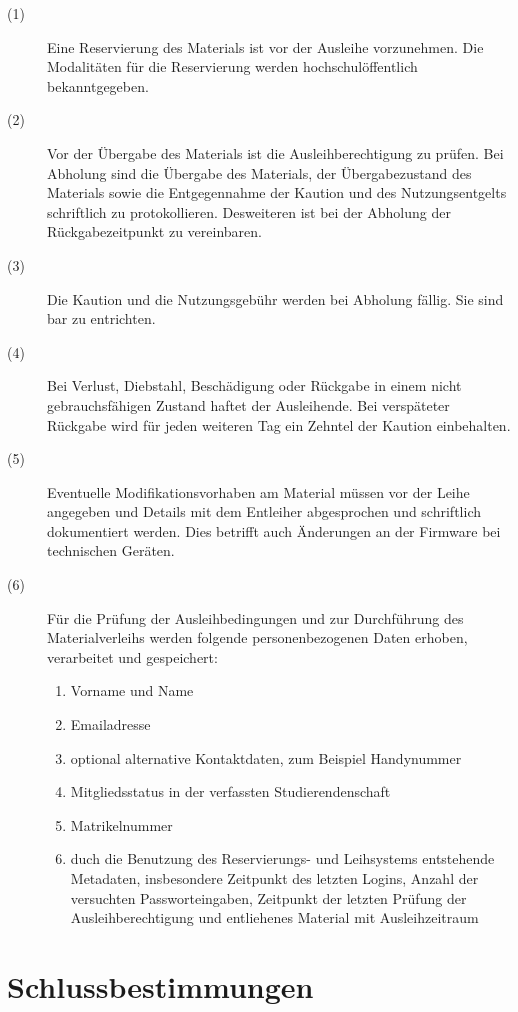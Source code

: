 \documentclass[a4paper]{article}
\begin{document}
\begin{description}
\item[(1)] Eine Reservierung des Materials ist vor der Ausleihe vorzunehmen. Die Modalitäten für die Reservierung werden hochschulöffentlich bekanntgegeben.
\item[(2)] Vor der Übergabe des Materials ist die Ausleihberechtigung zu prüfen. Bei Abholung sind die Übergabe des Materials, der Übergabezustand des Materials sowie die Entgegennahme der Kaution und des Nutzungsentgelts schriftlich zu protokollieren. Desweiteren ist bei der Abholung der Rückgabezeitpunkt zu vereinbaren.
\item[(3)] Die Kaution und die Nutzungsgebühr werden bei Abholung fällig. Sie sind bar zu entrichten.
\item[(4)] Bei Verlust, Diebstahl, Beschädigung oder Rückgabe in einem nicht gebrauchsfähigen Zustand haftet der Ausleihende. Bei verspäteter Rückgabe wird für jeden weiteren Tag ein Zehntel der Kaution einbehalten.
\item[(5)] Eventuelle Modifikationsvorhaben am Material müssen vor der Leihe angegeben und Details mit dem Entleiher abgesprochen und schriftlich dokumentiert werden. Dies betrifft auch Änderungen an der Firmware bei technischen Geräten.
\item[(6)] Für die Prüfung der Ausleihbedingungen und zur Durchführung des Materialverleihs werden folgende personenbezogenen Daten erhoben, verarbeitet und gespeichert:
\begin{enumerate}
\item Vorname und Name
\item Emailadresse
\item optional alternative Kontaktdaten, zum Beispiel Handynummer
\item Mitgliedsstatus in der verfassten Studierendenschaft
\item Matrikelnummer
\item duch die Benutzung des Reservierungs- und Leihsystems entstehende Metadaten, insbesondere Zeitpunkt des letzten Logins, Anzahl der versuchten Passworteingaben, Zeitpunkt der letzten Prüfung der Ausleihberechtigung und entliehenes Material mit Ausleihzeitraum
\end{enumerate}

\end{description}

\section{Schlussbestimmungen}
\end{document}

